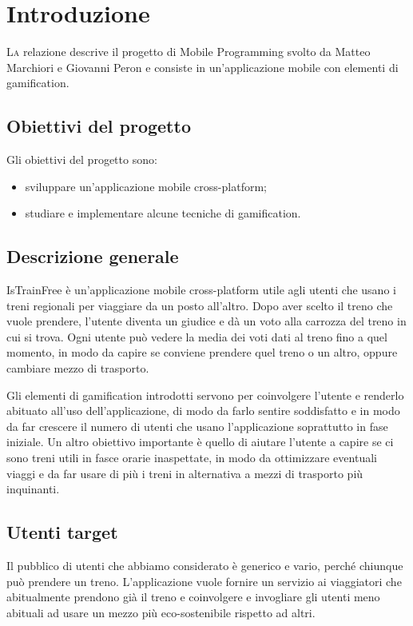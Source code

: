 \chapter{Introduzione\label{sec:introduzione}}
\lettrine[findent=1.5em]{L}a relazione descrive il progetto di Mobile Programming svolto da Matteo Marchiori e Giovanni Peron e consiste in un'applicazione mobile con elementi di gamification.

\section{Obiettivi del progetto\label{sec:obiettivi}}
Gli obiettivi del progetto sono:
\begin{itemize}
    \item sviluppare un'applicazione mobile cross-platform;
    \item studiare e implementare alcune tecniche di gamification.
\end{itemize}

\section{Descrizione generale\label{sec:descrizione}}
IsTrainFree è un'applicazione mobile cross-platform utile agli utenti che usano i treni regionali per viaggiare da un posto all'altro. Dopo aver scelto il treno che vuole prendere, l'utente diventa un giudice e dà un voto alla carrozza del treno in cui si trova. Ogni utente può vedere la media dei voti dati al treno fino a quel momento, in modo da capire se conviene prendere quel treno o un altro, oppure cambiare mezzo di trasporto.

Gli elementi di gamification introdotti servono per coinvolgere l'utente e renderlo abituato all'uso dell'applicazione, di modo da farlo sentire soddisfatto e in modo da far crescere il numero di utenti che usano l'applicazione soprattutto in fase iniziale.
Un altro obiettivo importante è quello di aiutare l'utente a capire se ci sono treni utili in fasce orarie inaspettate, in modo da ottimizzare eventuali viaggi e da far usare di più i treni in alternativa a mezzi di trasporto più inquinanti.

\section{Utenti target}
Il pubblico di utenti che abbiamo considerato è generico e vario, perché chiunque può prendere un treno.
L'applicazione vuole fornire un servizio ai viaggiatori che abitualmente prendono già il treno e coinvolgere e invogliare gli utenti meno abituali ad usare un mezzo più eco-sostenibile rispetto ad altri.